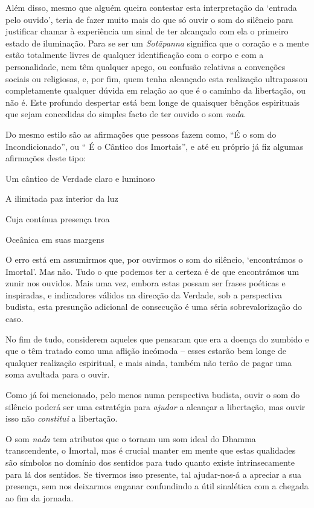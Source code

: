 Além disso, mesmo que alguém queira contestar esta interpretação da
`entrada pelo ouvido', teria de fazer muito mais do que só ouvir o som
do silêncio para justificar chamar à experiência um sinal de ter
alcançado com ela o primeiro estado de iluminação. Para se ser um
\emph{Sotāpanna} significa que o coração e a mente estão totalmente
livres de qualquer identificação com o corpo e com a personalidade, nem
têm qualquer apego, ou confusão relativas a convenções sociais ou
religiosas, e, por fim, quem tenha alcançado esta realização ultrapassou
completamente qualquer dúvida em relação ao que é o caminho da
libertação, ou não é. Este profundo despertar está bem longe de
quaisquer bênçãos espirituais que sejam concedidas do simples facto de
ter ouvido o som \emph{nada}.

Do mesmo estilo são as afirmações que pessoas fazem como, ``É o som do
Incondicionado'', ou `` É o Cântico dos Imortais'', e até eu próprio já
fiz algumas afirmações deste tipo:

Um cântico de Verdade claro e luminoso

A ilimitada paz interior da luz

Cuja contínua presença troa

Oceânica em suas margens\cite{portrait}

O erro está em assumirmos que, por ouvirmos o som do silêncio,
`encontrámos o Imortal'. Mas não. Tudo o que podemos ter a certeza é de
que encontrámos um zunir nos ouvidos. Mais uma vez, embora estas possam
ser frases poéticas e inspiradas, e indicadores válidos na direcção da
Verdade, sob a perspectiva budista, esta presunção adicional de
consecução é uma séria sobrevalorização do caso.

No fim de tudo, considerem aqueles que pensaram que era a doença do
zumbido e que o têm tratado como uma aflição incómoda -- esses estarão
bem longe de qualquer realização espiritual, e mais ainda, também não
terão de pagar uma soma avultada para o ouvir.

Como já foi mencionado, pelo menos numa perspectiva budista, ouvir o som
do silêncio poderá ser uma estratégia para \emph{ajudar} a alcançar a
libertação, mas ouvir isso não \emph{constitui} a libertação.

O som \emph{nada} tem atributos que o tornam um som ideal do Dhamma
transcendente, o Imortal, mas é crucial manter em mente que estas
qualidades são símbolos no domínio dos sentidos para tudo quanto existe
intrinsecamente para lá dos sentidos. Se tivermos isso presente, tal
ajudar-nos-á a apreciar a sua presença, sem nos deixarmos enganar
confundindo a útil sinalética com a chegada ao fim da jornada.

